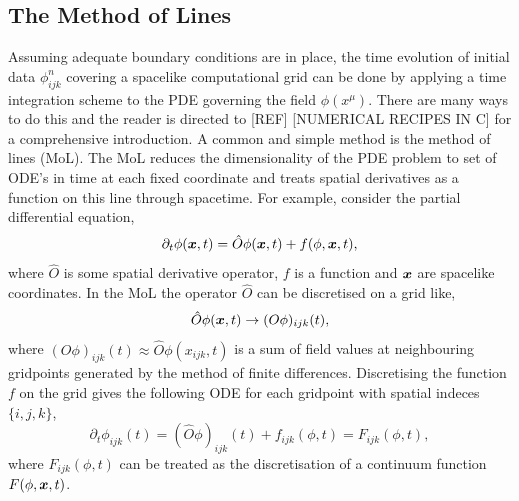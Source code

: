 \subsection{The Method of Lines} \label{grchombo:sec:mol}
Assuming adequate boundary conditions are in place, the time evolution of initial data $\phi^n_{ijk}$ covering a spacelike computational grid can be done by applying a time integration scheme to the PDE governing the field $\phi(x^\mu)$. There are many ways to do this and the reader is directed to [REF] [NUMERICAL RECIPES IN C] for a comprehensive introduction. A common and simple method is the method of lines (MoL). The MoL reduces the dimensionality of the PDE problem to set of ODE's in time at each fixed coordinate and treats spatial derivatives as a function on this line through spacetime. For example, consider the partial differential equation,
\begin{equation}
\partial_t \phi(\boldsymbol{x},t) = \hat{{O}} \phi(\boldsymbol{x},t) + f(\phi,\boldsymbol{x},t),
\end{equation}
where $\hat{{O}}$ is some spatial derivative operator, $f$ is a function and $\boldsymbol{x}$ are spacelike coordinates. In the MoL the operator $\hat{{O}}$ can be discretised on a grid like,
\begin{equation}
\hat{{O}} \phi (\boldsymbol{x},t) \rightarrow ({O} \phi)_{ijk}(t),
\end{equation}
where $({O} \phi)_{ijk}(t)\approx \hat{O} \phi (x_{ijk},t)$ is a sum of field values at neighbouring gridpoints generated by the method of finite differences. Discretising the function $f$ on the grid gives the following ODE for each gridpoint with spatial indeces $\{i,j,k\}$,
\begin{equation}
\partial_t \phi_{ijk}(t) = (\hat{O} \phi)_{ijk}(t) + f_{ijk}(\phi,t) = {F}_{ijk}(\phi,t), \label{grchombo:eq:MoL}
\end{equation}
where ${F}_{ijk}(\phi,t)$ can be treated as the discretisation of a continuum function ${F}(\phi,\boldsymbol{x},t)$. 

